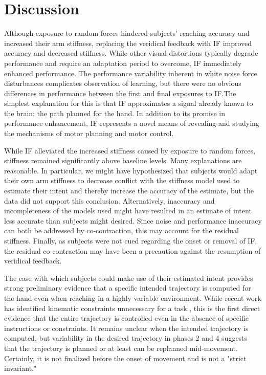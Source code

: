 \documentclass{frontiersSCNS} %
\begin{document}
\section{Discussion}

Although exposure to random forces hindered subjects’ reaching accuracy and increased their arm stiffness, replacing the veridical feedback with IF improved accuracy and decreased stiffness. While other visual distortions typically degrade performance and require an adaptation period to overcome, IF immediately enhanced performance. The performance variability inherent in white noise force disturbances complicates observation of learning, but there were no obvious differences in performance between the first and final exposures to IF.The simplest explanation for this is that IF approximates a signal already known to the brain: the path planned for the hand. In addition to its promise in performance enhancement, IF represents a novel means of revealing and studying the mechanisms of motor planning and motor control.

While IF alleviated the increased stiffness caused by exposure to random forces, stiffness remained significantly above baseline levels. Many explanations are reasonable. In particular, we might have hypothesized that subjects would adapt their own arm stiffness to decrease conflict with the stiffness model used to estimate their intent and thereby increase the accuracy of the estimate, but the data did not support this conclusion. Alternatively, inaccuracy and incompleteness of the models used might have resulted in an estimate of intent less accurate than subjects might desired. Since noise and performance inaccuracy can both be addressed by co-contraction, this may account for the residual stiffness. Finally, as subjects were not cued regarding the onset or removal of IF, the residual co-contraction may have been a precaution against the resumption of veridical feedback.

The ease with which subjects could make use of their estimated intent provides strong preliminary evidence that a specific intended trajectory is computed for the hand even when reaching in a highly variable environment. While recent work has identified kinematic constraints unnecessary for a task \citep{mistry2013optimal}, this is the first direct evidence that the entire trajectory is controlled even in the absence of specific instructions or constraints. It remains unclear when the intended trajectory is computed, but variability in the desired trajectory in phases 2 and 4 suggests that the trajectory is planned or at least can be replanned mid-movement. Certainly, it is not finalized before the onset of movement and is not a "strict invariant."
\end{document}
